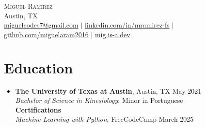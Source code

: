 \documentclass[letterpaper,10pt]{article}
\begin{document}
\begin{center}
  {\Huge \scshape Miguel Ramirez} \\ \vspace{1pt}
  Austin, TX \\ 
  \href{mailto:miguelcodes7@gmail.com}{miguelcodes7@gmail.com} $|$
  \href{https://linkedin.com/in/mramirez-fs}{linkedin.com/in/mramirez-fs} $|$
  \href{https://github.com/miguelaram2016}{github.com/miguelaram2016} $|$
  \href{https://mig.is-a.dev}{mig.is-a.dev}
\end{center}

\section*{Education}
\begin{itemize}[leftmargin=0.15in]
  \item[]
    \textbf{The University of Texas at Austin}, Austin, TX \hfill May 2021 \\
    \textit{Bachelor of Science in Kinesiology}; Minor in Portuguese \\
    \textbf{Certifications} \\
    \textit{Machine Learning with Python}, FreeCodeCamp \hfill March 2025 
\end{itemize}

\end{document}
